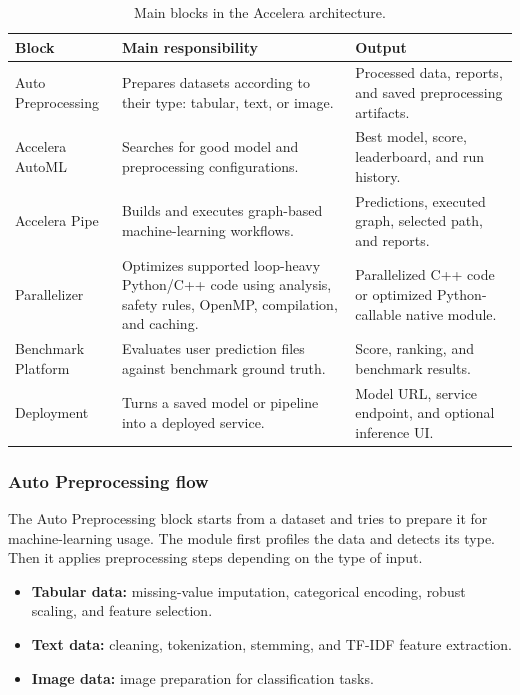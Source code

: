 \documentclass[12pt,a4paper]{report}
\begin{document}
\begin{table}[!htbp]
\centering
\caption{Main blocks in the Accelera architecture.}
\label{tab:block-diagram-modules}
\small
\renewcommand{\arraystretch}{1.15}
\setlength{\tabcolsep}{4pt}
\begin{tabularx}{\textwidth}{p{}X X}
\toprule
Block & Main responsibility & Output \\
\midrule
Auto Preprocessing &
Prepares datasets according to their type: tabular, text, or image. &
Processed data, reports, and saved preprocessing artifacts. \\

Accelera AutoML &
Searches for good model and preprocessing configurations. &
Best model, score, leaderboard, and run history. \\

Accelera Pipe &
Builds and executes graph-based machine-learning workflows. &
Predictions, executed graph, selected path, and reports. \\

Parallelizer &
Optimizes supported loop-heavy Python/C++ code using analysis, safety rules,
OpenMP, compilation, and caching. &
Parallelized C++ code or optimized Python-callable native module. \\

Benchmark Platform &
Evaluates user prediction files against benchmark ground truth. &
Score, ranking, and benchmark results. \\

Deployment &
Turns a saved model or pipeline into a deployed service. &
Model URL, service endpoint, and optional inference UI. \\
\bottomrule
\end{tabularx}
\renewcommand{\arraystretch}{1.0}
\end{table}

\subsubsection*{Auto Preprocessing flow}

The Auto Preprocessing block starts from a dataset and tries to prepare it for
machine-learning usage. The module first profiles the data and detects its type.
Then it applies preprocessing steps depending on the type of input.

\begin{itemize}
  \item \textbf{Tabular data:} missing-value imputation, categorical encoding,
  robust scaling, and feature selection.
  \item \textbf{Text data:} cleaning, tokenization, stemming, and TF-IDF feature
  extraction.
  \item \textbf{Image data:} image preparation for classification tasks.
\end{itemize}
\end{document}
